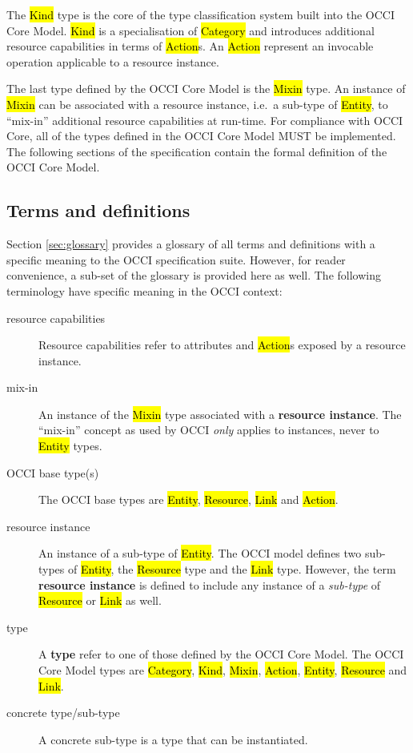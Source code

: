 \documentclass[10pt,a4paper]{article}
\begin{document}
The \hl{Kind} type is the core of the type classification
system built into the OCCI Core Model. \hl{Kind} is a specialisation of
\hl{Category} and introduces additional resource capabilities in terms of \hl{Action}s.
An \hl{Action} represent an invocable operation applicable to a resource
instance.

The last type defined by the OCCI Core Model is the \hl{Mixin} type. An instance of
\hl{Mixin} can be associated with a resource instance, i.e.~a sub-type of
\hl{Entity}, to ``mix-in'' additional resource capabilities at run-time.
%
For compliance with OCCI Core, all of the types defined in the OCCI Core Model MUST
be implemented.  The following sections of the specification contain the formal
definition of the OCCI Core Model.

\subsection{Terms and definitions}
Section \ref{sec:glossary} provides a glossary of all terms and definitions with
a specific meaning to the OCCI specification suite. However, for reader
convenience, a sub-set of the glossary is provided here as well. The following
terminology have specific meaning in the OCCI context:
\begin{description}
\item[resource capabilities] Resource capabilities refer to attributes and
 \hl{Action}s exposed by a resource instance.
\item[mix-in] An instance of the \hl{Mixin} type associated with a {\bf resource
 instance}. The ``mix-in'' concept as used by OCCI {\em only} applies to
 instances, never to \hl{Entity} types.
\item[OCCI base type(s)] The OCCI base types are \hl{Entity}, \hl{Resource},
 \hl{Link} and \hl{Action}.
\item[resource instance] An instance of a sub-type of \hl{Entity}. The OCCI
 model defines two sub-types of \hl{Entity}, the \hl{Resource} type and the
 \hl{Link} type.  However, the term {\bf resource instance} is defined to
 include any instance of a {\em sub-type} of \hl{Resource} or \hl{Link} as
 well.
\item[type] A {\bf type} refer to one of those defined by the OCCI Core Model.
The OCCI Core Model types are \hl{Category}, \hl{Kind}, \hl{Mixin}, \hl{Action},
\hl{Entity}, \hl{Resource} and \hl{Link}.
\item[concrete type/sub-type] A concrete sub-type is a type that can be instantiated.
\end{description}
\end{document}
